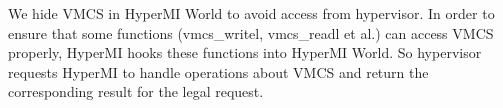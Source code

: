 \documentclass[conference]{IEEEtran}
\begin{document}
%


We hide VMCS in HyperMI World to avoid access from hypervisor. 
In order to ensure that some functions (vmcs\_writel, vmcs\_readl et al.) can access VMCS properly, HyperMI hooks these functions into HyperMI World. So hypervisor requests HyperMI to handle operations about VMCS and return the corresponding result for the legal request. 
\end{document}

